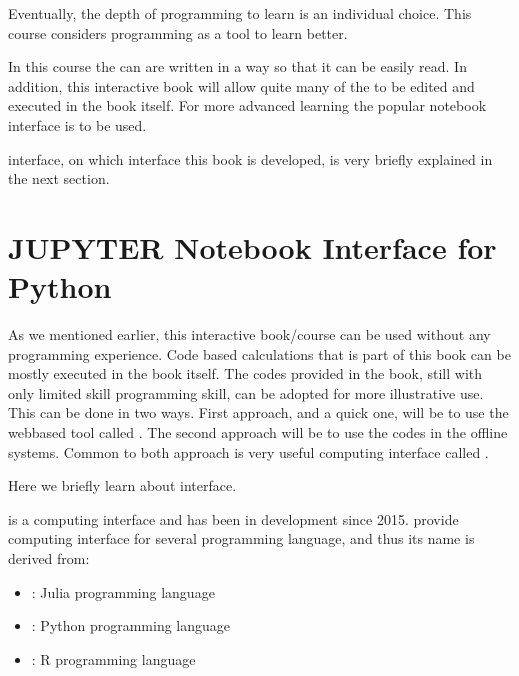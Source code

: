 \documentclass[letterpaper,10pt,english]{jupyterBook}
\begin{document}
\sphinxAtStartPar
Eventually, the depth of programming to learn is an individual choice. This course considers programming as a tool to learn better.

\sphinxAtStartPar
In this course the  can are written in a way so that it can be easily read. In addition, this interactive book will allow quite many of the  to be edited and executed in the book itself. For more advanced learning the popular notebook interface  is to be used.

\sphinxAtStartPar
{} interface, on which interface this book is developed, is very briefly explained in the next section.

\sphinxstepscope


\chapter{JUPYTER Notebook Interface for Python}
\label{\detokenize{content/background/02_jupyter:jupyter-notebook-interface-for-python}}\label{\detokenize{content/background/02_jupyter::doc}}
\sphinxAtStartPar
As we mentioned earlier, this interactive book/course can be used without any programming experience. Code based calculations that is part of this book can be mostly executed in the book itself. The codes provided in the book, still with only limited skill programming skill, can be adopted for more illustrative use. This can be done in two ways. First approach, and a quick one, will be to use the web\sphinxhyphen{}based tool called . The second approach will be to use the codes in the off\sphinxhyphen{}line systems. Common to both approach is very useful computing interface called .

\sphinxAtStartPar
Here we briefly learn about  interface.

\sphinxAtStartPar
{} is a computing interface and has been in development since 2015.  provide computing interface for several programming language, and thus its name is derived from:
\begin{itemize}
\item {} 
\sphinxAtStartPar
{} : Julia programming language

\item {} 
\sphinxAtStartPar
{} : Python programming language

\item {} 
\sphinxAtStartPar
{}  : R programming language

\end{itemize}
\end{document}
